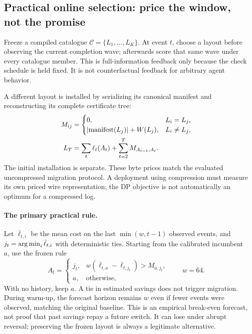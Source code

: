\subsection{Practical online selection: price the window, not the promise}\label{sec:online}
Freeze a compiled catalogue $\mathcal C=\{L_1,\ldots,L_K\}$. At event $t$, choose
a layout before observing the current completion wave; afterwards score that same
wave under every catalogue member. This is full-information feedback only because
the check schedule is held fixed. It is not counterfactual feedback for arbitrary
agent behavior.

A different layout is installed by serializing its canonical manifest and
reconstructing its complete certificate tree:
\begin{align}
M_{ij}&=\begin{cases}0,&L_i=L_j,\\ |\mathrm{manifest}(L_j)|+W(L_j),&L_i\ne L_j,\end{cases}\notag\\
L_T&=\sum_{t}\ell_t(A_t)+\sum_{t=2}^{T}M_{A_{t-1},A_t}.\label{eq:mig}\end{align}
The initial installation is separate. These byte prices match the evaluated
uncompressed migration protocol. A deployment using compression must measure its
own priced wire representation; the DP objective is not automatically an optimum
for a compressed log.

\paragraph{The primary practical rule.}
Let $\bar\ell_{t,i}$ be the mean cost on the last $\min(w,t-1)$ observed events,
and $j_t=\operatorname*{arg\,min}_i\bar\ell_{t,i}$ with deterministic ties. Starting from the
calibrated incumbent $a$, use the frozen rule
\begin{equation}A_t=\begin{cases} j_t,& w(\bar\ell_{t,a}-\bar\ell_{t,j_t})>M_{a,j_t},\\ a,&\text{otherwise},\end{cases}\qquad w=64.\label{eq:window}\end{equation}
With no history, keep $a$. A tie in estimated savings does not trigger migration.
During warm-up, the forecast horizon remains $w$ even if fewer events were
observed, matching the original baseline. This is an empirical break-even
forecast, not proof that past savings repay a future switch. It can lose under
abrupt reversal; preserving the frozen layout is always a legitimate alternative.

